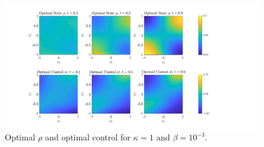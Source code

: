 \documentclass[11pt, a4paper]{article}
\theoremstyle{definition}
\begin{document}
	\begin{figure}[h]
		\centering
		\includegraphics[scale=0.35]{SCEx1k1.png}
		\caption{Optimal $\rho$ and optimal control for $\kappa = 1$ and $\beta = 10^{-3}$.} 
		\label{F1c}
	\end{figure}
	
\end{document}
